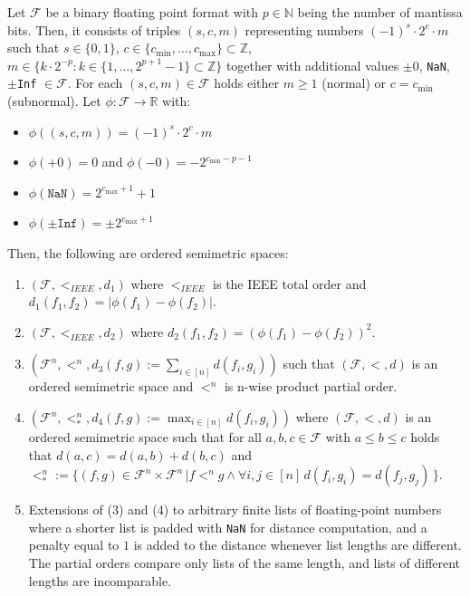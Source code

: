 \begin{proposition} 
\label{prop:fp-space}
Let $\mathcal{F}$ be a binary floating point format with $p \in \mathbb{N}$ being the number of mantissa bits. Then, it consists of triples $(s, c, m)$ representing numbers $(-1)^s \cdot 2^c \cdot m$ such that $s \in \{0,1\}$, $c \in \{c_{\min},\dots, c_{\max}\} \subset \mathbb{Z}$, $m \in \{k \cdot 2^{-p} : k \in \{1, \dots, 2^{p+1}-1\} \subset \mathbb{Z}\}$ together with additional values $\pm0$, \texttt{NaN}, $\pm$\texttt{Inf} $\in \mathcal{F}$. For each $(s, c, m) \in \mathcal{F}$ holds either $m \geq 1$ (normal) or $c = c_{\min}$ (subnormal). Let $\phi : \mathcal{F} \rightarrow \mathbb{R}$ with:
\begin{itemize}
    \item $\phi((s,c,m)) = (-1)^s \cdot 2^c \cdot m$ 
    \item $\phi(+0) = 0$ and $\phi(-0) = -2^{c_{\min} - p - 1}$
    \item $\phi(\texttt{NaN}) = 2^{c_{\max} + 1}  + 1$
    \item $\phi(\pm\texttt{Inf}) = \pm 2^{c_{\max} + 1}$
\end{itemize}
Then, the following are ordered semimetric spaces:
\begin{enumerate}
    \item $(\mathcal{F}, <_{IEEE}, d_1)$ where $<_{IEEE}$ is the IEEE total order and $d_1(f_1, f_2) = |\phi(f_1) - \phi(f_2)|$.
    \item $(\mathcal{F}, <_{IEEE}, d_2)$ where $d_2(f_1, f_2) = (\phi(f_1) - \phi(f_2))^2$.
    \item $(\mathcal{F}^n, <^n, d_3(f, g) := \sum_{i \in [n]} d(f_i, g_i))$ such that $(\mathcal{F}, <, d)$ is an ordered semimetric space and $<^n$ is n-wise product partial order.
    \item $(\mathcal{F}^n, <^{n}_*, d_4(f, g) := \max_{i \in [n]}d(f_i, g_i))$ where $(\mathcal{F},<,d)$ is an ordered semimetric space such that for all $a,b,c\in\mathcal{F}$ with $a \leq b \leq c$ holds that $d(a,c) = d(a,b) + d(b,c)$ and $<^n_* := \{(f,g) \in \mathcal{F}^n \times \mathcal{F}^n\,|f <^n g \wedge \forall i,j \in [n]\, d(f_i, g_i) = d(f_j, g_j)\,\}$.
    \item Extensions of (3) and (4) to arbitrary finite lists of floating-point numbers where a shorter list is padded with \texttt{NaN} for distance computation, and a penalty equal to $1$ is added to the distance whenever list lengths are different. The partial orders compare only lists of the same length, and lists of different lengths are incomparable.
\end{enumerate}
\end{proposition}

